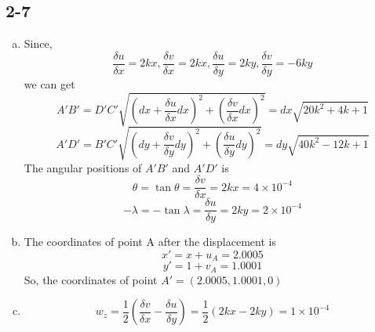 \documentclass[onecolumn,oneside]{SUSTechHomework}
\begin{document}
  \subsection*{2-7}
  \begin{enumerate}[(a)]
    \item Since, 
    \[\frac{\delta u}{\delta x} = 2kx, \frac{\delta v}{\delta x} = 2kx, \frac{\delta u}{\delta y} = 2ky, \frac{\delta v}{\delta y} = -6ky\]
    we can get 
    \[A' B' = D' C'\sqrt{(dx+\frac{\delta u}{\delta x}dx)^2 + (\frac{\delta v}{\delta x}dx)^2} = dx\sqrt{20k^2 + 4k + 1}\]
    \[A' D' = B' C'\sqrt{(dy+\frac{\delta v}{\delta y}dy)^2 + (\frac{\delta u}{\delta y}dy)^2} = dy\sqrt{40k^2 - 12k + 1}\]
    The angular positions of \(A' B'\) and \(A' D'\) is
    \[
    \theta = \tan \theta = \frac{\delta v}{\delta x} = 2kx = 4\times 10^{-4}
    \]
    \[
    -\lambda = -\tan \lambda = \frac{\delta u}{\delta y} = 2ky = 2\times 10^{-4}
    \]
    

    \item The coordinates of point A after the displacement is \[x' = x + u_A = 2.0005\] \[y' = 1 + v_A = 1.0001\]
    So, the coordinates of point \(A' = (2.0005, 1.0001, 0)\) 
    \item \[w_z = \frac{1}{2}(\frac{\delta v}{\delta x} - \frac{\delta u}{\delta y}) = \frac{1}{2}(2kx-2ky) = 1\times 10^{-4}\]
  \end{enumerate}
\end{document}
